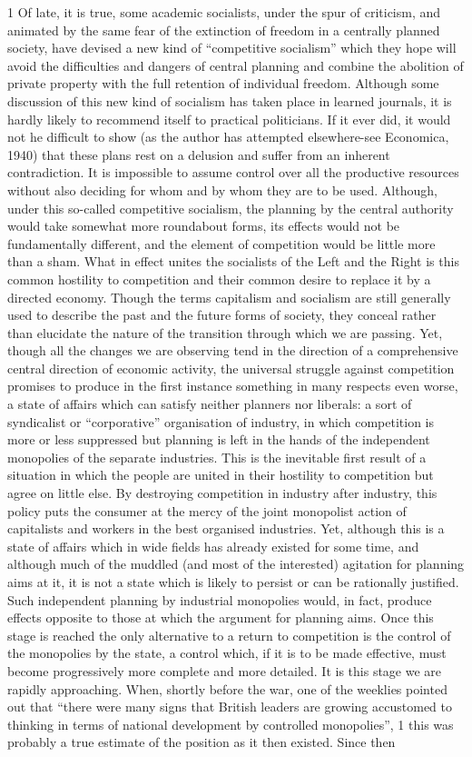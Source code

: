 \documentclass[11pt,openany]{book}
\begin{document}
1 Of late, it is true, some academic socialists, under the spur of criticism, and animated by the same fear of the extinction of freedom in a centrally planned society, have devised a new kind of ``competitive socialism'' which they hope will avoid the difficulties and dangers of central planning and combine the abolition of private property with the full retention of individual freedom. Although some discussion of this new kind of socialism has taken place in learned journals, it is hardly likely to recommend itself to practical politicians. If it ever did, it would not he difficult to show (as the author has attempted elsewhere-see Economica, 1940) that these plans rest on a delusion and suffer from an inherent contradiction. It is impossible to assume control over all the productive resources without also deciding for whom and by whom they are to be used. Although, under this so-called competitive socialism, the planning by the central authority would take somewhat more roundabout forms, its effects would not be fundamentally different, and the element of competition would be little more than a sham. What in effect unites the socialists of the Left and the Right is this common hostility to competition and their common desire to replace it by a directed economy. Though the terms capitalism and socialism are still generally used to describe the past and the future forms of society, they conceal rather than elucidate the nature of the transition through which we are passing. Yet, though all the changes we are observing tend in the direction of a comprehensive central direction of economic activity, the universal struggle against competition promises to produce in the first instance something in many respects even worse, a state of affairs which can satisfy neither planners nor liberals: a sort of syndicalist or ``corporative'' organisation of industry, in which competition is more or less suppressed but planning is left in the hands of the independent monopolies of the separate industries. This is the inevitable first result of a situation in which the people are united in their hostility to competition but agree on little else. By destroying competition in industry after industry, this policy puts the consumer at the mercy of the joint monopolist action of capitalists and workers in the best organised industries. Yet, although this is a state of affairs which in wide fields has already existed for some time, and although much of the muddled (and most of the interested) agitation for planning aims at it, it is not a state which is likely to persist or can be rationally justified. Such independent planning by industrial monopolies would, in fact, produce effects opposite to those at which the argument for planning aims. Once this stage is reached the only alternative to a return to competition is the control of the monopolies by the state, a control which, if it is to be made effective, must become progressively more complete and more detailed. It is this stage we are rapidly approaching. When, shortly before the war, one of the weeklies pointed out that ``there were many signs that British leaders are growing accustomed to thinking in terms of national development by controlled monopolies'', 1 this was probably a true estimate of the position as it then existed. Since then 
\end{document}
